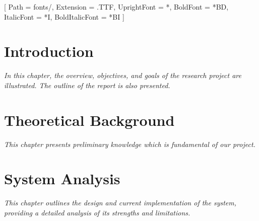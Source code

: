 \documentclass[12pt]{report}
\begin{document}



\setmainfont{TIMES}[
    Path = fonts/,
    Extension = .TTF,
    UprightFont = *,
    BoldFont = *BD,
    ItalicFont = *I,
    BoldItalicFont = *BI
]











\renewcommand*{\glossaryname}{Table of Glossary}
\printglossaries





\listoftables
\newpage

\listoffigures
\newpage


\chapter{Introduction}

\textit{In this chapter, the overview, objectives, and goals of the research project are illustrated. The outline of the report is also presented.}











\chapter{Theoretical Background}
\textit{This chapter presents preliminary knowledge which is fundamental of our project.}







\chapter{System Analysis}
\textit{This chapter outlines the design and current implementation of the system, providing a detailed analysis of its strengths and limitations.}




\end{document}
